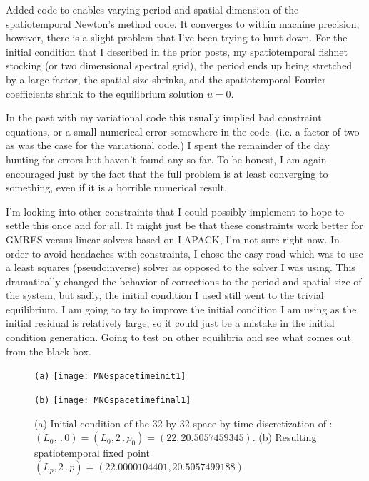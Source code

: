 Added code to enables varying period and spatial dimension of the spatiotemporal
Newton's method code. It converges to within machine precision, however, there is a
slight problem that I've been trying to hunt down. For the initial condition that
I described in the prior posts, my spatiotemporal fishnet stocking (or two dimensional
spectral grid), the period ends up being stretched by a large factor, the spatial size
shrinks, and the spatiotemporal Fourier coefficients shrink to the equilibrium solution $u=0$.

In the past with my variational code this usually implied bad constraint equations, or a small
numerical error somewhere in the code. (i.e. a factor of two as was the case for the variational
code.) I spent the remainder of the day hunting for errors but haven't found any so far. To be honest,
I am again encouraged just by the fact that the full problem is at least converging to something, even
if it is a horrible numerical result.

I'm looking into other constraints that I could possibly implement to hope to settle this once and
for all. It might just be that these constraints work better for GMRES versus linear solvers based
on LAPACK, I'm not sure right now.
In order to avoid headaches with constraints, I chose the easy road which was to use a least
squares (pseudoinverse) solver as opposed to the solver I was using.
This dramatically changed the behavior of corrections to the period and spatial size of the
system, but sadly, the initial condition I used still went to the trivial equilibrium. I am
going to try to improve the initial condition I am using as the initial residual is relatively
large, so it could just be a mistake in the initial condition generation. Going to test
on other equilibria and see what comes out from the black box.


\begin{figure}[ht]
\begin{minipage}[height=.32\textheight]{.45\textwidth}
\centering \small{\texttt{(a)}}
\texttt{[image: MNGspacetimeinit1]}
\end{minipage}
\begin{minipage}[height=.32\textheight]{.45\textwidth}
\centering \small{\texttt{(b)}}
\texttt{[image: MNGspacetimefinal1]}
\end{minipage}
\caption{ \label{fig:MNGspacetime11}
(a) Initial condition of the 32-by-32 space-by-time discretization of :
$(L_0,\period{0}) = (L_0, 2\period{p_0})= (22,20.5057459345)$.
(b) Resulting spatiotemporal fixed point
$(L_p,2\period{p}) =  (22.0000104401, 20.5057499188)$
}
\end{figure}

